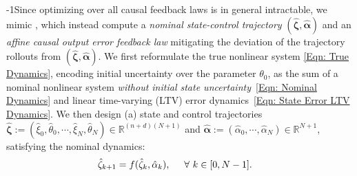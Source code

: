 \documentclass[letterpaper, 10 pt, conference]{ieeeconf}
\newcommand{\R}{\mathbb{R}}
\newcommand{\?}{\stackrel{?}{=}}
\newcommand{\param}{\theta}
\newcommand{\paramDim}{d}
\newcommand{\var}{\xi}
\newcommand{\varDim}{n}
\newcommand{\varStacked}{\boldsymbol{\var}}
\newcommand{\paramStacked}{\boldsymbol{\param}}
\newcommand{\varNominal}{\hat\var}
\newcommand{\paramNominal}{\hat\param}
\newcommand{\ratePGDNominal}{\hat\ratePGD}
\newcommand{\paramNominalStacked}{\hat{\boldsymbol{\param}}}
\newcommand{\ratePGDNominalStacked}{\hat{\boldsymbol{\ratePGD}}}
\newcommand{\ratePGD}{\alpha}
\newcommand{\dynamicsPGD}{f_{\text{PGD}}}
\newcommand{\feedbackMap}{\pi}
\newcommand{\iterationHorizon}{N}
\newcommand{\state}{\zeta}
\newcommand{\stateNominal}{\hat\state}
\newcommand{\stateNominalStacked}{\hat{\boldsymbol{\state}}}
\newcommand{\dynamicsFullState}{f}
\newcommand{\antoine}[1]{{\textcolor[rgb]{1,0,0}{\textsf{[Antoine: {#1}]}}}}
\begin{document}
\looseness-1Since optimizing over all causal feedback laws is in general intractable, we mimic \cite{leeman2026vision, Leeman2025RobustNonlinearOptimalControlviaSLS},
which instead compute a \textit{nominal state-control trajectory} $(\stateNominalStacked, \ratePGDNominalStacked)$ and an \textit{affine causal output error feedback law} mitigating the deviation of the trajectory rollouts from $(\stateNominalStacked, \ratePGDNominalStacked)$.
We first reformulate the true nonlinear system \eqref{Eqn: True Dynamics}, encoding initial uncertainty over the parameter $\param_0$, 
as the sum of a nominal nonlinear system \textit{without initial state uncertainty}~\eqref{Eqn: Nominal Dynamics} and linear time-varying (LTV) error dynamics~\eqref{Eqn: State Error LTV Dynamics}.
We then design (a) state and control trajectories $\stateNominalStacked
:= (\varNominal_0, \paramNominal_0, \cdots, \varNominal_\iterationHorizon, \paramNominal_\iterationHorizon) 
\in \R^{(\varDim + \paramDim)(\iterationHorizon + 1)}$ and $\ratePGDNominalStacked := (\ratePGDNominal_0, \cdots, \ratePGDNominal_\iterationHorizon) \in \R^{\iterationHorizon + 1}$,
satisfying the nominal dynamics:
\begin{align}
\label{Eqn: Nominal Dynamics}
    \stateNominal_{k+1} &= \dynamicsFullState(\stateNominal_k, \ratePGDNominal_k), \hspace{5mm} \forall \ k \in [0, \iterationHorizon - 1].
\end{align}
\end{document}
